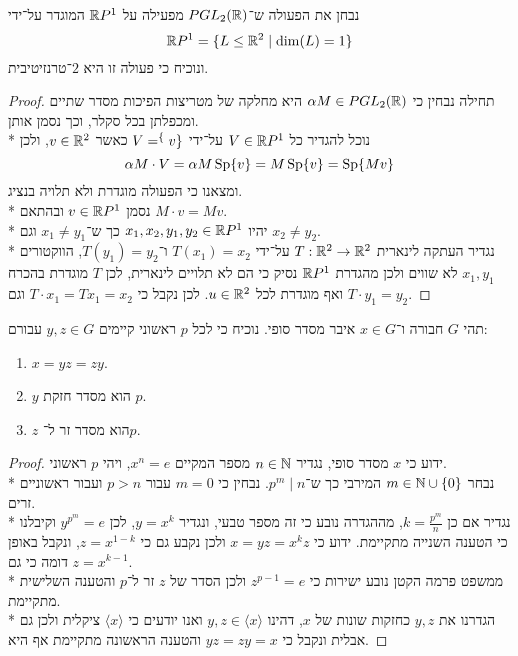 \Subquestion{}
נבחן את הפעולה ש־$PGL_2(\mathbb{R})$ מפעילה על $\mathbb{R} P^1$ המוגדר על־ידי
\[
	\mathbb{R} P^1 = \{ L \le \mathbb{R}^2 \mid \dim(L) = 1 \}
\]
ונוכיח כי פעולה זו היא $2$־טרנזיטיבית.
\begin{proof}
	תחילה נבחין כי $\alpha M \in PGL_2(\mathbb{R})$ היא מחלקה של מטריצות הפיכות מסדר שתיים ומכפלתן בכל סקלר, וכך נסמן אותן. \\*
	נוכל להגדיר כל $V \in \mathbb{R} P^1$ על־ידי $V = \sp\{ v\}$ כאשר $v \in \mathbb{R}^2$, ולכן
	\[
		\alpha M \cdot V = \alpha M \operatorname{Sp}\{ v \} = M \operatorname{Sp}\{ v \} = \operatorname{Sp}\{ Mv \}
	\]
	ומצאנו כי הפעולה מוגדרת ולא תלויה בנציג. \\*
	נסמן $v \in \mathbb{R} P^1$ ובהתאם $M \cdot v = Mv$. \\*
	יהיו $x_1, x_2, y_1, y_2 \in \mathbb{R} P^1$ כך ש־$x_1 \ne y_1$ וגם $x_2 \ne y_2$. \\*
	נגדיר העתקה לינארית $T : \mathbb{R}^2 \to \mathbb{R}^2$ על־ידי $T(x_1) = x_2$ ו־$T(y_1) = y_2$, הווקטורים $x_1, y_1$ לא שווים ולכן מהגדרת $\mathbb{R} P^1$ נסיק כי הם לא תלויים לינארית, לכן $T$ מוגדרת בהכרח ואף מוגדרת לכל $u \in \mathbb{R}^2$.
	לכן נקבל כי $T \cdot x_1 = T x_1 = x_2$ וגם $T \cdot y_1 = y_2$.
\end{proof}

\Question{}
תהי $G$ חבורה ו־$x \in G$ איבר מסדר סופי.
נוכיח כי לכל $p$ ראשוני קיימים $y, z \in G$ עבורם:
\begin{enumerate}
	\item $x = yz = zy$.
	\item $y$ הוא מסדר חזקת $p$.
	\item $z$ הוא מסדר זר ל־$p$.
\end{enumerate}
\begin{proof}
	ידוע כי $x$ מסדר סופי, נגדיר $n \in \mathbb{N}$ מספר המקיים $x^n = e$, ויהי $p$ ראשוני. \\*
	נבחר $m \in \mathbb{N} \cup \{0\}$ המירבי כך ש־$p^m \mid n$. נבחין כי $m = 0$ עבור $p > n$ ועבור ראשוניים זרים. \\*
	נגדיר אם כן $k = \frac{p^m}{n}$, מההגדרה נובע כי זה מספר טבעי, ונגדיר $y = x^k$, לכן $y^{p^m} = e$ וקיבלנו כי הטענה השנייה מתקיימת.
	ידוע כי $x = y z = x^k z$ ולכן נקבע גם כי $z = x^{1 - k}$, ונקבל באופן דומה כי גם $z = x^{k - 1}$. \\*
	ממשפט פרמה הקטן נובע ישירות כי $z^{p - 1} = e$ ולכן הסדר של $z$ זר ל־$p$ והטענה השלישית מתקיימת. \\*
	הגדרנו את $y, z$ כחזקות שונות של $x$, דהינו $y,z \in \langle x \rangle$ ואנו יודעים כי $\langle x \rangle$ ציקלית ולכן גם אבלית ונקבל כי $y z = z y = x$ והטענה הראשונה מתקיימת אף היא.
\end{proof}


